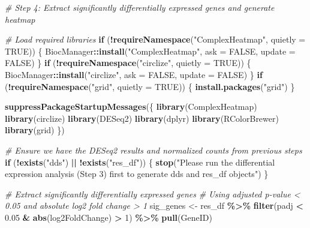 \documentclass[
]{article}
\newenvironment{Shaded}{\begin{snugshade}}{\end{snugshade}}
\newcommand{\AttributeTok}[1]{\textcolor[rgb]{0.13,0.29,0.53}{#1}}
\newcommand{\CommentTok}[1]{\textcolor[rgb]{0.56,0.35,0.01}{\textit{#1}}}
\newcommand{\ConstantTok}[1]{\textcolor[rgb]{0.56,0.35,0.01}{#1}}
\newcommand{\ControlFlowTok}[1]{\textcolor[rgb]{0.13,0.29,0.53}{\textbf{#1}}}
\newcommand{\DecValTok}[1]{\textcolor[rgb]{0.00,0.00,0.81}{#1}}
\newcommand{\FloatTok}[1]{\textcolor[rgb]{0.00,0.00,0.81}{#1}}
\newcommand{\FunctionTok}[1]{\textcolor[rgb]{0.13,0.29,0.53}{\textbf{#1}}}
\newcommand{\NormalTok}[1]{#1}
\newcommand{\OtherTok}[1]{\textcolor[rgb]{0.56,0.35,0.01}{#1}}
\newcommand{\SpecialCharTok}[1]{\textcolor[rgb]{0.81,0.36,0.00}{\textbf{#1}}}
\newcommand{\StringTok}[1]{\textcolor[rgb]{0.31,0.60,0.02}{#1}}
\begin{document}
\begin{Shaded}
\begin{Highlighting}[]
\CommentTok{\# Step 4: Extract significantly differentially expressed genes and generate heatmap}

\CommentTok{\# Load required libraries}
\ControlFlowTok{if}\NormalTok{ (}\SpecialCharTok{!}\FunctionTok{requireNamespace}\NormalTok{(}\StringTok{"ComplexHeatmap"}\NormalTok{, }\AttributeTok{quietly =} \ConstantTok{TRUE}\NormalTok{)) \{}
\NormalTok{  BiocManager}\SpecialCharTok{::}\FunctionTok{install}\NormalTok{(}\StringTok{"ComplexHeatmap"}\NormalTok{, }\AttributeTok{ask =} \ConstantTok{FALSE}\NormalTok{, }\AttributeTok{update =} \ConstantTok{FALSE}\NormalTok{)}
\NormalTok{\}}
\ControlFlowTok{if}\NormalTok{ (}\SpecialCharTok{!}\FunctionTok{requireNamespace}\NormalTok{(}\StringTok{"circlize"}\NormalTok{, }\AttributeTok{quietly =} \ConstantTok{TRUE}\NormalTok{)) \{}
\NormalTok{  BiocManager}\SpecialCharTok{::}\FunctionTok{install}\NormalTok{(}\StringTok{"circlize"}\NormalTok{, }\AttributeTok{ask =} \ConstantTok{FALSE}\NormalTok{, }\AttributeTok{update =} \ConstantTok{FALSE}\NormalTok{)}
\NormalTok{\}}
\ControlFlowTok{if}\NormalTok{ (}\SpecialCharTok{!}\FunctionTok{requireNamespace}\NormalTok{(}\StringTok{"grid"}\NormalTok{, }\AttributeTok{quietly =} \ConstantTok{TRUE}\NormalTok{)) \{}
  \FunctionTok{install.packages}\NormalTok{(}\StringTok{"grid"}\NormalTok{)}
\NormalTok{\}}

\FunctionTok{suppressPackageStartupMessages}\NormalTok{(\{}
  \FunctionTok{library}\NormalTok{(ComplexHeatmap)}
  \FunctionTok{library}\NormalTok{(circlize)}
  \FunctionTok{library}\NormalTok{(DESeq2)}
  \FunctionTok{library}\NormalTok{(dplyr)}
  \FunctionTok{library}\NormalTok{(RColorBrewer)}
  \FunctionTok{library}\NormalTok{(grid)}
\NormalTok{\})}

\CommentTok{\# Ensure we have the DESeq2 results and normalized counts from previous steps}
\ControlFlowTok{if}\NormalTok{ (}\SpecialCharTok{!}\FunctionTok{exists}\NormalTok{(}\StringTok{"dds"}\NormalTok{) }\SpecialCharTok{||} \SpecialCharTok{!}\FunctionTok{exists}\NormalTok{(}\StringTok{"res\_df"}\NormalTok{)) \{}
  \FunctionTok{stop}\NormalTok{(}\StringTok{"Please run the differential expression analysis (Step 3) first to generate \textquotesingle{}dds\textquotesingle{} and \textquotesingle{}res\_df\textquotesingle{} objects"}\NormalTok{)}
\NormalTok{\}}

\CommentTok{\# Extract significantly differentially expressed genes}
\CommentTok{\# Using adjusted p{-}value \textless{} 0.05 and absolute log2 fold change \textgreater{} 1}
\NormalTok{sig\_genes }\OtherTok{\textless{}{-}}\NormalTok{ res\_df }\SpecialCharTok{\%\textgreater{}\%}
  \FunctionTok{filter}\NormalTok{(padj }\SpecialCharTok{\textless{}} \FloatTok{0.05} \SpecialCharTok{\&} \FunctionTok{abs}\NormalTok{(log2FoldChange) }\SpecialCharTok{\textgreater{}} \DecValTok{1}\NormalTok{) }\SpecialCharTok{\%\textgreater{}\%}
  \FunctionTok{pull}\NormalTok{(GeneID)}


\end{Highlighting}
\end{Shaded}
\end{document}
